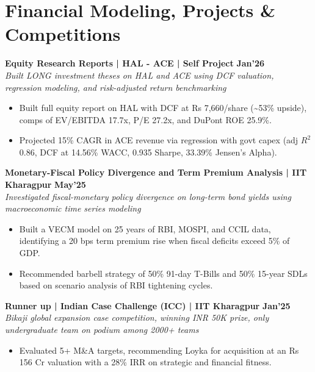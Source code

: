 \documentclass[10pt, a4paper]{article}
\newenvironment{achievelist}{
  \begin{itemize}[leftmargin=1.2em, itemsep=0.5pt, parsep=0pt, topsep=1pt]
    \small
}{
  \end{itemize}
  \vspace{-2pt}
}
\newcommand{\achieve}[1]{\item #1}
\begin{document}
\vspace{-2pt}

\section{Financial Modeling, Projects \& Competitions}

\textbf{Equity Research Reports | HAL - ACE | Self Project} \hfill \textbf{\small Jan'26} \\
\textit{\small Built LONG investment theses on HAL and ACE using DCF valuation, regression modeling, and risk-adjusted return benchmarking}
\begin{achievelist}
  \achieve{Built full equity report on HAL with DCF at Rs 7,660/share (\textasciitilde 53\% upside), comps of EV/EBITDA 17.7x, P/E 27.2x, and DuPont ROE 25.9\%.}
  \achieve{Projected 15\% CAGR in ACE revenue via regression with govt capex (adj $R^2$ 0.86, DCF at 14.56\% WACC, 0.935 Sharpe, 33.39\% Jensen's Alpha).}
\end{achievelist}

\textbf{Monetary-Fiscal Policy Divergence and Term Premium Analysis | IIT Kharagpur} \hfill \textbf{\small May'25} \\
\textit{\small Investigated fiscal-monetary policy divergence on long-term bond yields using macroeconomic time series modeling}
\begin{achievelist}
  \achieve{Built a VECM model on 25 years of RBI, MOSPI, and CCIL data, identifying a 20 bps term premium rise when fiscal deficits exceed 5\% of GDP.}
  \achieve{Recommended barbell strategy of 50\% 91-day T-Bills and 50\% 15-year SDLs based on scenario analysis of RBI tightening cycles.}
\end{achievelist}

\textbf{Runner up | Indian Case Challenge (ICC) | IIT Kharagpur} \hfill \textbf{\small Jan'25} \\
\textit{\small Bikaji global expansion case competition, winning INR 50K prize, only undergraduate team on podium among 2000+ teams}
\begin{achievelist}
  \achieve{Evaluated 5+ M\&A targets, recommending Loyka for acquisition at an Rs 156 Cr valuation with a 28\% IRR on strategic and financial fitness.}
\end{achievelist}

\vspace{-2pt}

\end{document}
